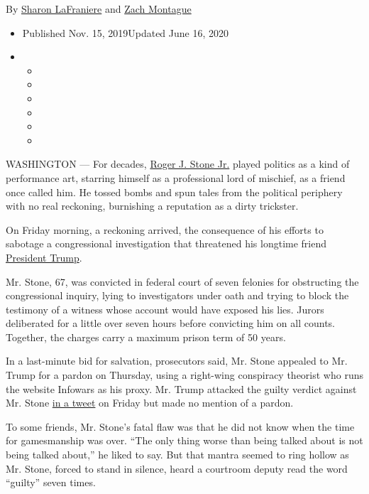 By \href{https://www.nytimes.com/by/sharon-lafraniere}{Sharon
LaFraniere} and \href{https://www.nytimes.com/by/zach-montague}{Zach
Montague}

\begin{itemize}
\item
  Published Nov. 15, 2019Updated June 16, 2020
\item
  \begin{itemize}
  \item
  \item
  \item
  \item
  \item
  \item
  \end{itemize}
\end{itemize}

WASHINGTON --- For decades,
\href{https://www.nytimes.com/2020/06/16/us/politics/roger-stone-prosecutor-hearing.html}{Roger
J. Stone Jr.} played politics as a kind of performance art, starring
himself as a professional lord of mischief, as a friend once called him.
He tossed bombs and spun tales from the political periphery with no real
reckoning, burnishing a reputation as a dirty trickster.

On Friday morning, a reckoning arrived, the consequence of his efforts
to sabotage a congressional investigation that threatened his longtime
friend
\href{https://www.nytimes.com/2020/02/12/us/politics/trump-stone.html}{President
Trump}.

Mr. Stone, 67, was convicted in federal court of seven felonies for
obstructing the congressional inquiry, lying to investigators under oath
and trying to block the testimony of a witness whose account would have
exposed his lies. Jurors deliberated for a little over seven hours
before convicting him on all counts. Together, the charges carry a
maximum prison term of 50 years.

In a last-minute bid for salvation, prosecutors said, Mr. Stone appealed
to Mr. Trump for a pardon on Thursday, using a right-wing conspiracy
theorist who runs the website Infowars as his proxy. Mr. Trump attacked
the guilty verdict against Mr. Stone
\href{https://twitter.com/realDonaldTrump/status/1195389483664990208}{in
a tweet} on Friday but made no mention of a pardon.

To some friends, Mr. Stone's fatal flaw was that he did not know when
the time for gamesmanship was over. ``The only thing worse than being
talked about is not being talked about,'' he liked to say. But that
mantra seemed to ring hollow as Mr. Stone, forced to stand in silence,
heard a courtroom deputy read the word ``guilty'' seven times.

